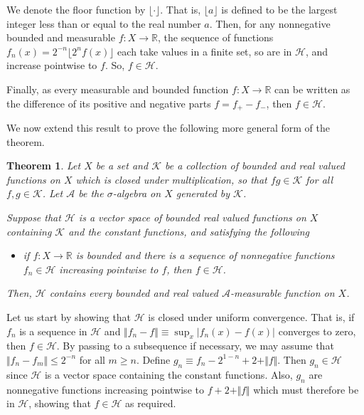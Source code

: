 \documentclass[12pt]{article}
\newtheorem{theorem}{Theorem}
\begin{document}
We denote the floor function by $\lfloor\cdot\rfloor$. That is, $\lfloor a\rfloor$ is defined to be the largest integer less than or equal to the real number $a$.
Then, for any nonnegative bounded and measurable $f\colon X\rightarrow\mathbb{R}$, the sequence of functions $f_n(x)=2^{-n}\lfloor 2^n f(x)\rfloor$ each take values in a finite set, so are in $\mathcal{H}$, and increase pointwise to $f$. So, $f\in \mathcal{H}$.

Finally, as every measurable and bounded function $f\colon X\rightarrow\mathbb{R}$ can be written as the difference of its positive and negative parts $f=f_+-f_-$, then $f\in \mathcal{H}$.


We now extend this result to prove the following more general form of the theorem.

\begin{theorem}\label{thm:2}
Let $X$ be a set and $\mathcal{K}$ be a collection of bounded and real valued functions on $X$ which is closed under multiplication, so that $fg\in\mathcal{K}$ for all $f,g\in\mathcal{K}$. Let $\mathcal{A}$ be the $\sigma$-algebra on $X$ generated by $\mathcal{K}$.

Suppose that $\mathcal{H}$ is a vector space of bounded real valued functions on $X$ containing $\mathcal{K}$ and the constant functions, and satisfying the following
\begin{itemize}
\item if $f\colon X\rightarrow\mathbb{R}$ is bounded and there is a sequence of nonnegative functions $f_n\in \mathcal{H}$ increasing pointwise to $f$, then $f\in \mathcal{H}$.
\end{itemize}
Then, $\mathcal{H}$ contains every bounded and real valued $\mathcal{A}$-measurable function on $X$.
\end{theorem}

Let us start by showing that $\mathcal{H}$ is closed under uniform convergence. That is, if $f_n$ is a sequence in $\mathcal{H}$ and $\Vert f_n-f\Vert \equiv \sup_x|f_n(x)-f(x)|$ converges to zero, then $f\in\mathcal{H}$. By passing to a subsequence if necessary, we may assume that $\Vert f_n-f_m\Vert\le 2^{-n}$ for all $m\ge n$. Define $g_n\equiv f_n-2^{1-n}+2+\Vert f\Vert$. Then $g_n\in\mathcal{H}$ since $\mathcal{H}$ is a vector space containing the constant functions. Also, $g_n$ are nonnegative functions increasing pointwise to $f+2+\Vert f\Vert$ which must therefore be in $\mathcal{H}$, showing that $f\in\mathcal{H}$ as required.
\end{document}
